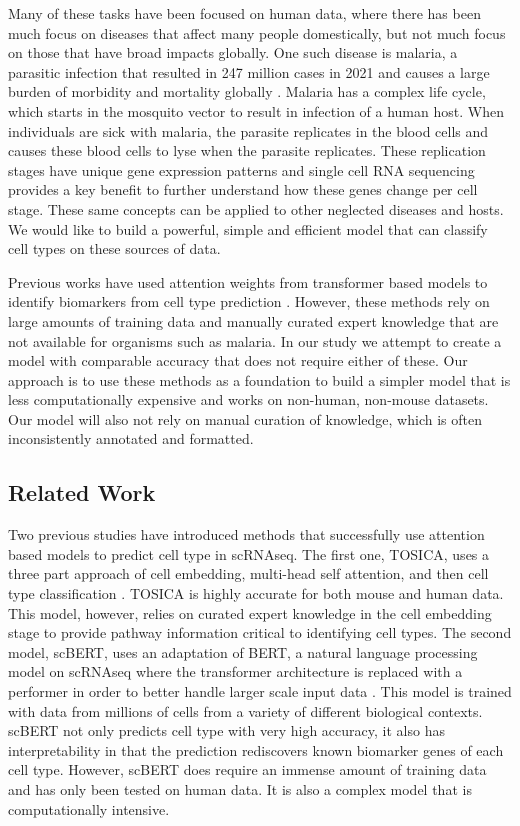 \documentclass{article}
\begin{document}
Many of these tasks have been focused on human data, where there has been much focus on diseases that affect many people domestically, but not much focus on those that have broad impacts globally. One such disease is malaria, a parasitic infection that resulted in 247 million cases in 2021 and causes a large burden of morbidity and mortality globally \cite{organizationWorldMalariaReport2022}. Malaria has a complex life cycle, which starts in the mosquito vector to result in infection of a human host. When individuals are sick with malaria, the parasite replicates in the blood cells and causes these blood cells to lyse when the parasite replicates. These replication stages have unique gene expression patterns and single cell RNA sequencing provides a key benefit to further understand how these genes change per cell stage. These same concepts can be applied to other neglected diseases and hosts. We would like to build a powerful, simple and efficient model that can classify cell types on these sources of data. 

Previous works have used attention weights from transformer based models to identify biomarkers from cell type prediction \cite{chenTransformerOneStop2023} \cite{yangScBERTLargescalePretrained2022}. However, these methods rely on large amounts of training data and manually curated expert knowledge that are not available for organisms such as malaria. In our study we attempt to create a model with comparable accuracy that does not require either of these. Our approach is to use these methods as a foundation to build a simpler model that is less computationally expensive and works on non-human, non-mouse datasets. Our model will also not rely on manual curation of knowledge, which is often inconsistently annotated and formatted.

\subsection{Related Work}

Two previous studies have introduced methods that successfully use attention based models to predict cell type in scRNAseq. The first one, TOSICA, uses a three part approach of cell embedding, multi-head self attention, and then cell type classification \cite{chenTransformerOneStop2023}. TOSICA is highly accurate for both mouse and human data. This model, however, relies on curated expert knowledge in the cell embedding stage to provide pathway information critical to identifying cell types. The second model, scBERT, uses an adaptation of BERT, a natural language processing model on scRNAseq where the transformer architecture is replaced with a performer in order to better handle larger scale input data \cite{yangScBERTLargescalePretrained2022}. This model is trained with data from millions of cells from a variety of different biological contexts. scBERT not only predicts cell type with very high accuracy, it also has interpretability in that the prediction rediscovers known biomarker genes of each cell type. However, scBERT does require an immense amount of training data and has only been tested on human data. It is also a complex model that is computationally intensive.
\end{document}
